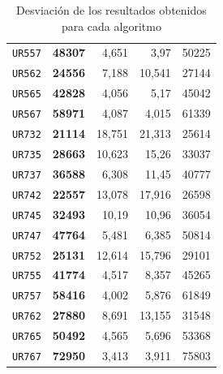 \documentclass[11pt]{article}
\begin{document}
\begin{table}[htbp]
\begin{center}
\begin{tabular}{|r|r|r|r|r|}
   \texttt{UR557} & \textbf{48307} & 4,651 & 3,97 & 50225 \\
   \texttt{UR562} & \textbf{24556} & 7,188 & 10,541 & 27144 \\
   \texttt{UR565} & \textbf{42828} & 4,056 & 5,17 & 45042 \\
   \texttt{UR567} & \textbf{58971} & 4,087 & 4,015 & 61339 \\
   \texttt{UR732} & \textbf{21114} & 18,751 & 21,313 & 25614 \\
   \texttt{UR735} & \textbf{28663} & 10,623 & 15,26 & 33037 \\
   \texttt{UR737} & \textbf{36588} & 6,308 & 11,45 & 40777 \\
   \texttt{UR742} & \textbf{22557} & 13,078 & 17,916 & 26598 \\
   \texttt{UR745} & \textbf{32493} & 10,19 & 10,96 & 36054 \\
   \texttt{UR747} & \textbf{47764} & 5,481 & 6,385 & 50814 \\
   \texttt{UR752} & \textbf{25131} & 12,614 & 15,796 & 29101 \\
   \texttt{UR755} & \textbf{41774} & 4,517 & 8,357 & 45265 \\
   \texttt{UR757} & \textbf{58416} & 4,002 & 5,876 & 61849 \\
   \texttt{UR762} & \textbf{27880} & 8,691 & 13,155 & 31548 \\
   \texttt{UR765} & \textbf{50492} & 4,565 & 5,696 & 53368 \\
   \texttt{UR767} & \textbf{72950} & 3,413 & 3,911 & 75803 \\ \hline
   \end{tabular}
   \end{center}
   \caption{Desviación de los resultados obtenidos para cada algoritmo}
   \label{tablaDesv}
\end{table}   
\end{document}
